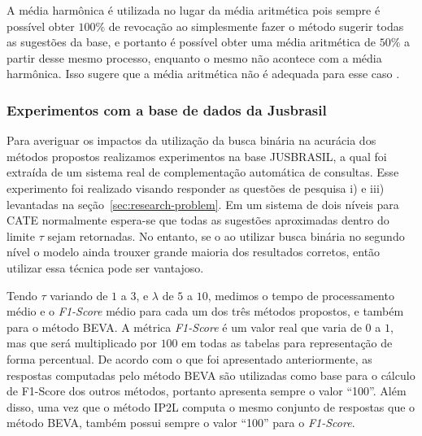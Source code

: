 A média harmônica é utilizada no lugar da média aritmética pois sempre é possível obter $100\%$ de revocação ao simplesmente fazer o método sugerir todas as sugestões da base, e portanto é possível obter uma média aritmética de $50\%$ a partir desse mesmo processo, enquanto o mesmo não acontece com a média harmônica. Isso sugere que a média aritmética não é adequada para esse caso \citep{irbookchristopher}.

\subsubsection{Experimentos com a base de dados da Jusbrasil}

Para averiguar os impactos da utilização da busca binária na acurácia dos métodos propostos realizamos experimentos na base JUSBRASIL, a qual foi extraída de um sistema real de complementação automática de consultas. Esse experimento foi realizado visando responder as questões de pesquisa i) e iii) levantadas na seção~\ref{sec:research-problem}. Em um sistema de dois níveis para CATE normalmente espera-se que todas as sugestões aproximadas dentro do limite $\tau$ sejam retornadas. No entanto, se o ao utilizar busca binária no segundo nível o modelo ainda trouxer grande maioria dos resultados corretos, então utilizar essa técnica pode ser vantajoso.

Tendo $\tau$ variando de $1$ a $3$, e $\lambda$ de $5$ a $10$, medimos o tempo de processamento médio e o \textit{F1-Score} médio para cada um dos três métodos propostos, e também para o método BEVA. A métrica \textit{F1-Score} é um valor real que varia de $0$ a $1$, mas que será multiplicado por $100$ em todas as tabelas para representação de forma percentual. De acordo com o que foi apresentado anteriormente, as respostas computadas pelo método BEVA são utilizadas como base para o cálculo de F1-Score dos outros métodos, portanto apresenta sempre o valor ``100''. Além disso, uma vez que o método IP2L computa o mesmo conjunto de respostas que o método BEVA, também possui sempre o valor ``100'' para o \textit{F1-Score}.


